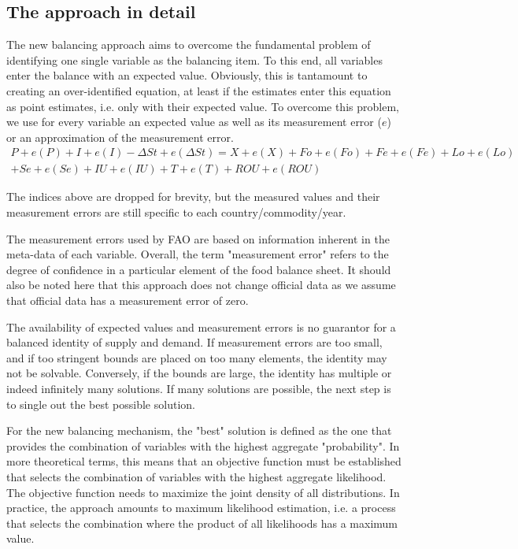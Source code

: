 \documentclass[nojss]{jss}
\begin{document}
\subsection{The approach in detail}
The new balancing approach aims to overcome the fundamental problem of identifying one single variable as the balancing item. To this end, all variables enter the balance with an expected value. Obviously, this is tantamount to creating an over-identified  equation, at least if the estimates enter this equation as point estimates, i.e. only with their expected value. To overcome this problem, we use for every variable an expected value as well as its measurement error ($e$) or an approximation of the measurement error.
\begin{multline}
    P + e(P) + I + e(I) - \Delta St + e(\Delta St) = X + e(X) + Fo +e(Fo) + Fe + e(Fe) + Lo + e(Lo)\\
    + Se + e(Se) + IU + e(IU) + T + e(T) + ROU + e(ROU)
\end{multline}

The indices above are dropped for brevity, but the measured values and their measurement errors are still specific to each country/commodity/year.

The measurement errors used by FAO are based on information inherent in the meta-data of each variable. Overall, the term "measurement error" refers to the degree of confidence in a particular element of the food balance sheet.  It should also be noted here that this approach does not change official data as we assume that official data has a measurement error of zero.
 
The availability of expected values and measurement errors is no guarantor for a balanced identity of supply and demand. If measurement errors are too small, and if too stringent bounds are placed on too many elements, the identity may not be solvable. Conversely, if the bounds are large, the identity has multiple or indeed infinitely many solutions. If many solutions are possible, the next step is to single out the best possible solution. 

For the new balancing mechanism, the "best" solution is defined as the one that provides the combination of variables with the highest aggregate "probability". In more theoretical terms, this means that an objective function must be established that selects the combination of variables with the highest aggregate likelihood. The objective function needs to maximize the joint density of all distributions. In practice, the approach amounts to maximum likelihood estimation, i.e. a process that selects the combination where the product of all likelihoods has a maximum value. 
\end{document}
